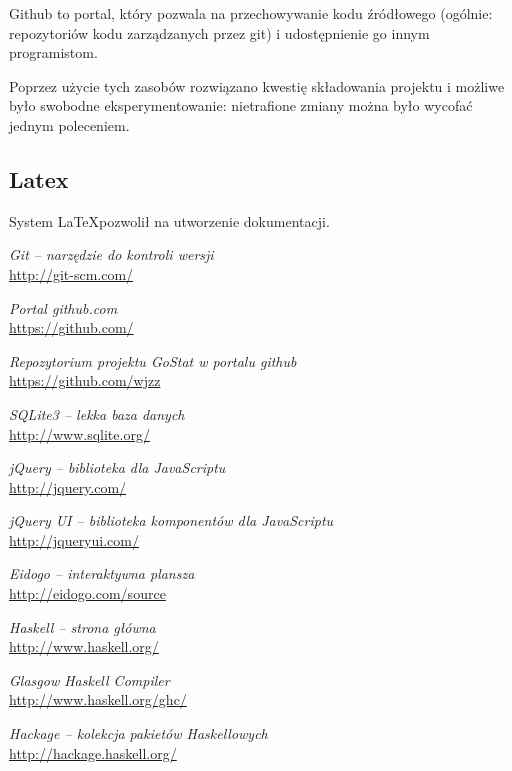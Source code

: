 \documentclass[10pt,leqno]{article}
\begin{document}
Github \cite{github} to portal, który pozwala na przechowywanie kodu źródłowego (ogólnie: repozytoriów kodu zarządzanych przez git)
i udostępnienie go innym programistom.

Poprzez użycie tych zasobów rozwiązano kwestię składowania projektu i możliwe było swobodne eksperymentowanie: nietrafione zmiany
można było wycofać jednym poleceniem.

\subsection{Latex}
System \LaTeX pozwolił na utworzenie dokumentacji.


\begin{thebibliography}{9}

  \emph{Git -- narzędzie do kontroli wersji} \\
  \url{http://git-scm.com/}

  \emph{Portal github.com} \\
  \url{https://github.com/}

  \emph{Repozytorium projektu GoStat w portalu github} \\
  \url{https://github.com/wjzz}

  \emph{SQLite3 -- lekka baza danych} \\
  \url{http://www.sqlite.org/}

  \emph{jQuery -- biblioteka dla JavaScriptu} \\
  \url{http://jquery.com/}

  \emph{jQuery UI -- biblioteka komponentów dla JavaScriptu} \\
  \url{http://jqueryui.com/}

  \emph{Eidogo -- interaktywna plansza} \\
  \url{http://eidogo.com/source}

  \emph{Haskell -- strona główna} \\
  \url{http://www.haskell.org/}

  \emph{Glasgow Haskell Compiler} \\
  \url{http://www.haskell.org/ghc/}

  \emph{Hackage -- kolekcja pakietów Haskellowych} \\
  \url{http://hackage.haskell.org/}


\end{thebibliography}
\end{document}
